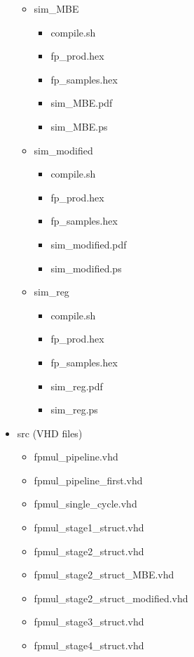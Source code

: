 \begin{itemize}
\begin{itemize}
\begin{itemize}
        \end{itemize}
        \item sim\_MBE
         \begin{itemize}
            \item compile.sh
            \item fp\_prod.hex
            \item fp\_samples.hex
            \item sim\_MBE.pdf
            \item sim\_MBE.ps
        \end{itemize}
        \item sim\_modified
         \begin{itemize}
            \item compile.sh
            \item fp\_prod.hex
            \item fp\_samples.hex
            \item sim\_modified.pdf
            \item sim\_modified.ps
        \end{itemize}
        \item sim\_reg
         \begin{itemize}
            \item compile.sh
            \item fp\_prod.hex
            \item fp\_samples.hex
            \item sim\_reg.pdf
            \item sim\_reg.ps
        \end{itemize}
    \end{itemize}
    \item src (VHD files)
        \begin{itemize}
            \item fpmul\_pipeline.vhd
            \item fpmul\_pipeline\_first.vhd
            \item fpmul\_single\_cycle.vhd
            \item fpmul\_stage1\_struct.vhd
            \item fpmul\_stage2\_struct.vhd
            \item fpmul\_stage2\_struct\_MBE.vhd
            \item fpmul\_stage2\_struct\_modified.vhd
            \item fpmul\_stage3\_struct.vhd
            \item fpmul\_stage4\_struct.vhd

\end{itemize}
\end{itemize}
